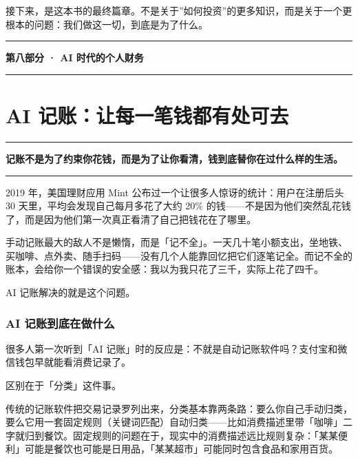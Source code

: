 \documentclass[a4paper,11pt,oneside,fontset=none,UTF8,zihao=-4]{ctexbook}
\newcommand{\partdivider}[1]{%
  \clearpage
  \thispagestyle{empty}%
  \vspace*{5.0cm}%
  \begin{center}%
    {\color{dh-blossom}\rule{0.35\textwidth}{1.5pt}\par}%
    \vspace{1.2cm}%
    {\Huge\bfseries\sffamily\color{dh-navy} #1\par}%
    \vspace{1.2cm}%
    {\color{dh-blossom}\rule{0.35\textwidth}{1.5pt}\par}%
  \end{center}%
  \vfill
  \clearpage
}
\begin{document}
接下来，是这本书的最终篇章。不是关于''如何投资''的更多知识，而是关于一个更根本的问题：我们做这一切，到底是为了什么。

\partdivider{第八部分 · AI 时代的个人财务}

\newpage

\chapter{AI
记账：让每一笔钱都有处可去}\label{ai-ux8bb0ux8d26ux8ba9ux6bcfux4e00ux7b14ux94b1ux90fdux6709ux5904ux53efux53bb}

\begin{center}{\color{dh-bronze}\rule{0.2\textwidth}{0.5pt}}\end{center}

\begin{dhquote}
\textbf{记账不是为了约束你花钱，而是为了让你看清，钱到底替你在过什么样的生活。}
\end{dhquote}

\begin{center}{\color{dh-bronze}\rule{0.2\textwidth}{0.5pt}}\end{center}

2019 年，美国理财应用 Mint 公布过一个让很多人惊讶的统计：用户在注册后头
30 天里，平均会发现自己每月多花了大约 20\%
的钱------不是因为他们突然乱花钱了，而是因为他们第一次真正看清了自己把钱花在了哪里。

手动记账最大的敌人不是懒惰，而是「记不全」。一天几十笔小额支出，坐地铁、买咖啡、点外卖、随手扫码------没有几个人能靠回忆把它们逐笔记全。而记不全的账本，会给你一个错误的安全感：我以为我只花了三千，实际上花了四千。

AI 记账解决的就是这个问题。

\subsection{AI
记账到底在做什么}\label{ai-ux8bb0ux8d26ux5230ux5e95ux5728ux505aux4ec0ux4e48}

很多人第一次听到「AI
记账」时的反应是：不就是自动记账软件吗？支付宝和微信钱包早就能看消费记录了。

区别在于「分类」这件事。

传统的记账软件把交易记录罗列出来，分类基本靠两条路：要么你自己手动归类，要么它用一套固定规则（关键词匹配）自动归类------比如消费描述里带「咖啡」二字就归到餐饮。固定规则的问题在于，现实中的消费描述远比规则复杂：「某某便利」可能是餐饮也可能是日用品，「某某超市」可能同时包含食品和家用百货。
\end{document}
